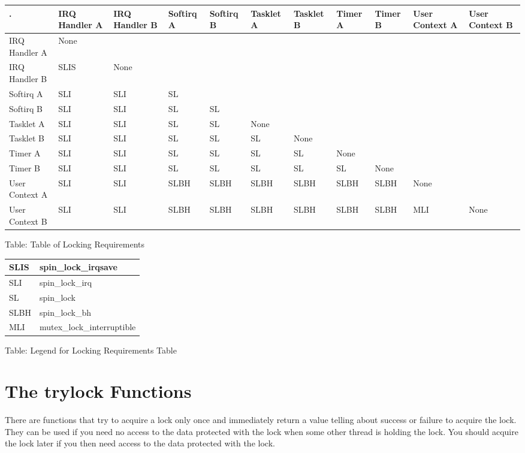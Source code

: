 \documentclass[a4paper,8pt,english]{sphinxmanual}
\begin{document}
\begin{tabulary}{\linewidth}{|L|L|L|L|L|L|L|L|L|L|L|}
\hline
\textsf{\relax 
.
} & \textsf{\relax 
IRQ Handler A
} & \textsf{\relax 
IRQ Handler B
} & \textsf{\relax 
Softirq A
} & \textsf{\relax 
Softirq B
} & \textsf{\relax 
Tasklet A
} & \textsf{\relax 
Tasklet B
} & \textsf{\relax 
Timer A
} & \textsf{\relax 
Timer B
} & \textsf{\relax 
User Context A
} & \textsf{\relax 
User Context B
}\\
\hline
IRQ Handler A
 & 
None
 &  &  &  &  &  &  &  &  & \\
\hline
IRQ Handler B
 & 
SLIS
 & 
None
 &  &  &  &  &  &  &  & \\
\hline
Softirq A
 & 
SLI
 & 
SLI
 & 
SL
 &  &  &  &  &  &  & \\
\hline
Softirq B
 & 
SLI
 & 
SLI
 & 
SL
 & 
SL
 &  &  &  &  &  & \\
\hline
Tasklet A
 & 
SLI
 & 
SLI
 & 
SL
 & 
SL
 & 
None
 &  &  &  &  & \\
\hline
Tasklet B
 & 
SLI
 & 
SLI
 & 
SL
 & 
SL
 & 
SL
 & 
None
 &  &  &  & \\
\hline
Timer A
 & 
SLI
 & 
SLI
 & 
SL
 & 
SL
 & 
SL
 & 
SL
 & 
None
 &  &  & \\
\hline
Timer B
 & 
SLI
 & 
SLI
 & 
SL
 & 
SL
 & 
SL
 & 
SL
 & 
SL
 & 
None
 &  & \\
\hline
User Context A
 & 
SLI
 & 
SLI
 & 
SLBH
 & 
SLBH
 & 
SLBH
 & 
SLBH
 & 
SLBH
 & 
SLBH
 & 
None
 & \\
\hline
User Context B
 & 
SLI
 & 
SLI
 & 
SLBH
 & 
SLBH
 & 
SLBH
 & 
SLBH
 & 
SLBH
 & 
SLBH
 & 
MLI
 & 
None
\\
\hline\end{tabulary}


Table: Table of Locking Requirements

\begin{tabulary}{\linewidth}{|L|L|}
\hline

SLIS
 & 
spin\_lock\_irqsave
\\
\hline
SLI
 & 
spin\_lock\_irq
\\
\hline
SL
 & 
spin\_lock
\\
\hline
SLBH
 & 
spin\_lock\_bh
\\
\hline
MLI
 & 
mutex\_lock\_interruptible
\\
\hline\end{tabulary}


Table: Legend for Locking Requirements Table


\section{The trylock Functions}
\label{kernel-hacking/locking:the-trylock-functions}
There are functions that try to acquire a lock only once and immediately
return a value telling about success or failure to acquire the lock.
They can be used if you need no access to the data protected with the
lock when some other thread is holding the lock. You should acquire the
lock later if you then need access to the data protected with the lock.
\end{document}
